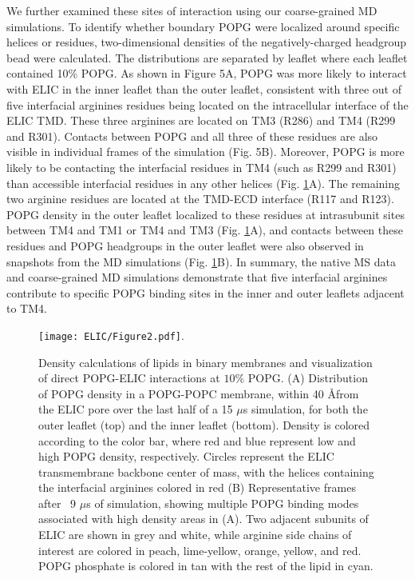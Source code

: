 We further examined these sites of interaction using our coarse-grained
MD simulations. To identify whether boundary POPG were localized around
specific helices or residues, two-dimensional densities of the
negatively-charged headgroup bead were calculated. The distributions are
separated by leaflet where each leaflet contained 10\% POPG. As shown in
Figure 5A, POPG was more likely to interact with ELIC in the inner
leaflet than the outer leaflet, consistent with three out of five
interfacial arginines residues being located on the intracellular
interface of the ELIC TMD. These three arginines are located on TM3
(R286) and TM4 (R299 and R301). Contacts between POPG and all three of
these residues are also visible in individual frames of the simulation
(Fig. 5B). Moreover, POPG is more likely to be contacting the
interfacial residues in TM4 (such as R299 and R301) than accessible
interfacial residues in any other helices (Fig. \ref{fig:Elic2}A). The remaining two
arginine residues are located at the TMD-ECD interface (R117 and R123).
POPG density in the outer leaflet localized to these residues at
intrasubunit sites between TM4 and TM1 or TM4 and TM3 (Fig. \ref{fig:Elic2}A), and
contacts between these residues and POPG headgroups in the outer leaflet
were also observed in snapshots from the MD simulations (Fig. \ref{fig:Elic2}B). In
summary, the native MS data and coarse-grained MD simulations
demonstrate that five interfacial arginines contribute to specific POPG
binding sites in the inner and outer leaflets adjacent to TM4.

\begin{figure}[htp]
	\center
\texttt{[image: ELIC/Figure2.pdf]}. 
\caption{Density calculations of lipids in binary membranes and visualization of direct POPG-ELIC interactions at $10\%$ POPG. (A) Distribution of POPG density in a POPG-POPC membrane, within 40 \AA from the ELIC pore over the last half of a 15 $\mu$s simulation, for both the outer leaflet (top) and the inner leaflet (bottom). Density is colored according to the color bar, where red and blue represent low and high POPG density, respectively. Circles represent the ELIC transmembrane backbone center of mass, with the helices containing the interfacial arginines colored in red (B) Representative frames after ~9 $\mu$s of simulation, showing multiple POPG binding modes associated with high density areas in (A). Two adjacent subunits of ELIC are shown in grey and white, while arginine side chains of interest are colored in peach, lime-yellow, orange, yellow, and red. POPG phosphate is colored in tan with the rest of the lipid in cyan.}
\label{fig:Elic2}
\end{figure}

